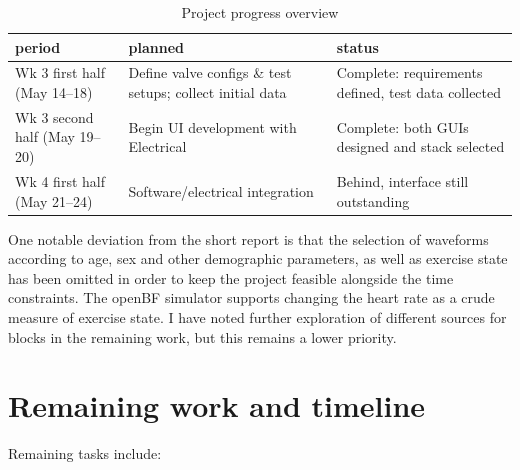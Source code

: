 \documentclass[10pt, a4paper]{article}
\begin{document}
\begin{table}[H]
  \small
  \centering
  \caption{Project progress overview}
  \begin{tabularx}{\textwidth}{@{}lXX@{}}
    \toprule
    period                        & planned                                                   & status                                              \\
    \midrule
    Wk 3 first half (May 14--18)  & Define valve configs \& test setups; collect initial data & Complete: requirements defined, test data collected \\
    Wk 3 second half (May 19--20) & Begin UI development with Electrical                      & Complete: both GUIs designed and stack selected     \\
    Wk 4 first half (May 21--24)  & Software/electrical integration                           & Behind, interface still outstanding                 \\
    \bottomrule
  \end{tabularx}
\end{table}

One notable deviation from the short report is that the selection of waveforms according to age, sex and other demographic parameters, as well as exercise state has been omitted in order to keep the project feasible alongside the time constraints.
The openBF simulator \cite{openBF.jl-2018} supports changing the heart rate as a crude measure of exercise state.
I have noted further exploration of different sources for blocks in the remaining work, but this remains a lower priority.

\section{Remaining work and timeline}

Remaining tasks include:
\end{document}
